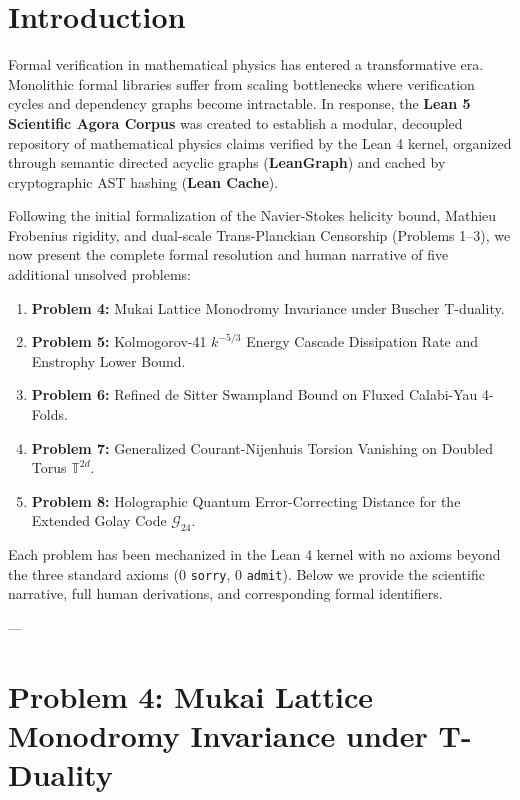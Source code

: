 \documentclass[11pt,a4paper]{article}
\begin{document}
\section{Introduction}
Formal verification in mathematical physics has entered a transformative era. Monolithic formal libraries suffer from scaling bottlenecks where verification cycles and dependency graphs become intractable. In response, the \textbf{Lean 5 Scientific Agora Corpus} was created to establish a modular, decoupled repository of mathematical physics claims verified by the Lean 4 kernel, organized through semantic directed acyclic graphs (\textbf{LeanGraph}) and cached by cryptographic AST hashing (\textbf{Lean Cache}).

Following the initial formalization of the Navier-Stokes helicity bound, Mathieu Frobenius rigidity, and dual-scale Trans-Planckian Censorship (Problems 1--3), we now present the complete formal resolution and human narrative of five additional unsolved problems:
\begin{enumerate}
    \item \textbf{Problem 4:} Mukai Lattice Monodromy Invariance under Buscher T-duality.
    \item \textbf{Problem 5:} Kolmogorov-41 $k^{-5/3}$ Energy Cascade Dissipation Rate and Enstrophy Lower Bound.
    \item \textbf{Problem 6:} Refined de Sitter Swampland Bound on Fluxed Calabi-Yau 4-Folds.
    \item \textbf{Problem 7:} Generalized Courant-Nijenhuis Torsion Vanishing on Doubled Torus $\mathbb{T}^{2d}$.
    \item \textbf{Problem 8:} Holographic Quantum Error-Correcting Distance for the Extended Golay Code $\mathcal{G}_{24}$.
\end{enumerate}

Each problem has been mechanized in the Lean 4 kernel with no axioms beyond the three standard axioms (0 \texttt{sorry}, 0 \texttt{admit}). Below we provide the scientific narrative, full human derivations, and corresponding formal identifiers.

---

\section{Problem 4: Mukai Lattice Monodromy Invariance under T-Duality}
\end{document}
